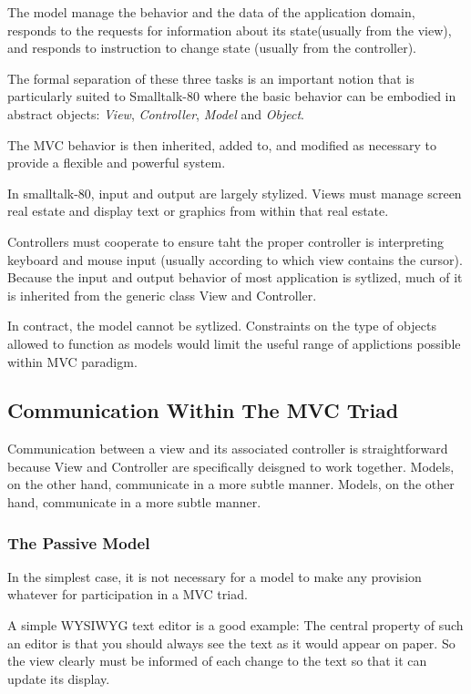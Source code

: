 \documentclass[a4paper, 11pt]{book}
\begin{document}
The model manage the behavior and the data of the application domain, responds
to the requests for information about its state(usually from the view), and
 responds to instruction to change state (usually from the controller).

The formal separation of these three tasks is an important notion that is
particularly suited to Smalltalk-80 where the basic behavior can be embodied in
abstract objects: \emph{View}, \emph{Controller}, \emph{Model} and
\emph{Object}.

The MVC behavior is then inherited, added to, and modified as necessary to
provide a flexible and powerful system.

In smalltalk-80, input and output are largely stylized. Views must manage screen
real estate and display text or graphics from within that real estate.

Controllers must cooperate to ensure taht the proper controller is interpreting
keyboard and mouse input (usually according to which view contains the cursor).
Because the input and output behavior of most application is sytlized, much of
it is inherited from the generic class View and Controller.

In contract, the model cannot be sytlized. Constraints on the type of objects 
allowed to function as models would limit the useful range of applictions 
possible within MVC paradigm.

\subsection{Communication Within The MVC Triad}
Communication between a view and its associated controller is straightforward
because View and Controller are specifically deisgned to work together. Models,
on the other hand, communicate in a more subtle manner.  Models, on the other 
hand, communicate in a more subtle manner.

\subsubsection{The Passive Model}
In the simplest case, it is not necessary for a model to make any provision
whatever for participation in a MVC triad. 

A simple WYSIWYG text editor is a good example:
The central property of such an editor is that you should always see the text as
it would appear on paper. So the view clearly must be informed of each change to
the text so that it can update its display. 
\end{document}
